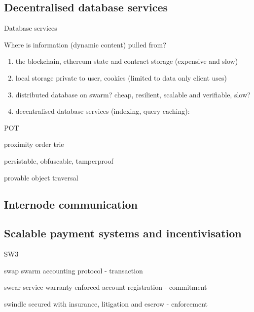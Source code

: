 \documentclass{beamer}
\begin{document}
\subsection{Decentralised database services}
\begin{frame}{Database services}
\begin{block}{Where is information (dynamic content) pulled from?}
\begin{enumerate}
\item the blockchain, ethereum state and contract storage (expensive and slow)
\item local storage private to user, cookies (limited to data only client uses)
\item distributed database on swarm? cheap, resilient, scalable and verifiable, slow?
\item decentralised database services (indexing, query caching):
\end{enumerate}
\end{block}
\end{frame}

\begin{frame}{POT}
\begin{block}{}
proximity order trie
\end{block}
\begin{block}{}
persistable, obfuscable, tamperproof
\end{block}
\begin{block}{}
provable object traversal
\end{block}
\end{frame}
\subsection{Internode communication}


\subsection{Scalable payment systems and incentivisation}

\begin{frame}{SW3}
\begin{block}{swap}
swarm accounting protocol - transaction
\end{block}
\begin{block}{swear}
service warranty enforced account registration - commitment
\end{block}
\begin{block}{swindle}
secured with insurance, litigation and escrow - enforcement
\end{block}
\end{frame}
\end{document}
